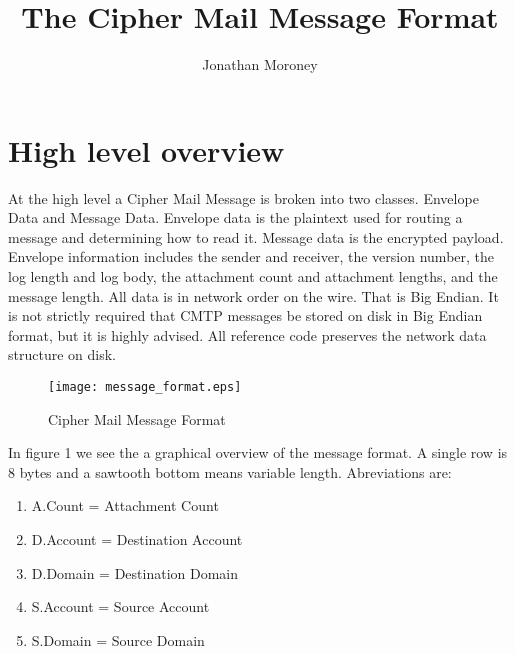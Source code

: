 \documentclass[a4paper,11pt]{article}
\title{The Cipher Mail Message Format}
\author{Jonathan Moroney}
\begin{document}
\maketitle
\tableofcontents


\section{High level overview}
At the high level a Cipher Mail Message is broken into two classes. Envelope Data and Message Data. Envelope data is the plaintext used for routing a message and determining how to read it. Message data is the encrypted payload. Envelope information includes the sender and receiver, the version number, the log length and log body, the attachment count and attachment lengths, and the message length. All data is in network order on the wire. That is Big Endian. It is not strictly required that CMTP messages be stored on disk in Big Endian format, but it is highly advised. All reference code preserves the network data structure on disk.
\begin{figure}[H]
\centering
\texttt{[image: message\_format.eps]}
\caption{Cipher Mail Message Format}
\end{figure}
In figure 1 we see the a graphical overview of the message format. A single row is 8 bytes and a sawtooth bottom means variable length. Abreviations are:
\begin{enumerate}
  \item A.Count = Attachment Count
  \item D.Account = Destination Account
  \item D.Domain = Destination Domain
  \item S.Account = Source Account
  \item S.Domain = Source Domain
\end{enumerate}
\end{document}
